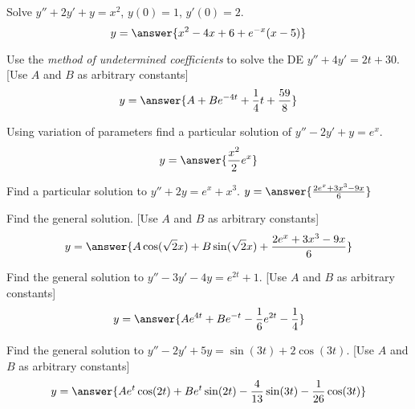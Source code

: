 \documentclass{ximera}
\begin{document}
\begin{exercise}%
    Solve $y''+2y'+y = x^2$, $y(0)=1$, $y'(0)=2$.
    \[
        y = \answer{x^2 - 4x + 6 + e^{-x}(x-5)}
    \]
\end{exercise}

\begin{exercise}
    Use the \textit{method of undetermined coefficients} to solve the DE $y''+4y'=2t+30$. [Use $A$ and $B$ as arbitrary constants]
    \[
        y = \answer{A + Be^{-4t} + \frac{1}{4}t + \frac{59}{8}}
    \]
\end{exercise}

\begin{exercise}
    Using variation of parameters find a particular solution of $y''-2y'+y = e^x$.
    \[
        y = \answer{\frac{x^2}{2}e^x}
    \]
%    
\end{exercise}


\begin{exercise}%
    Find a particular solution to $y''+2y=e^x + x^3$. $y=\answer{\frac{2e^x+3x^3-9x}{6}}$
    
    \begin{problem}
        Find the general solution. [Use $A$ and $B$ as arbitrary constants]
        \[
            y=\answer{A \cos(\sqrt{2} x) + B \sin(\sqrt{2} x) + \frac{2e^x+3x^3-9x}{6}}
        \]
    \end{problem}
\end{exercise}


\begin{exercise}
    Find the general solution to $y'' - 3y' - 4y = e^{2t} + 1$. [Use $A$ and $B$ as arbitrary constants]
    \[
        y=\answer{A e^{4t} + B e^{-t} - \frac{1}{6}e^{2t} - \frac{1}{4}}
    \]
\end{exercise}

\begin{exercise}
    Find the general solution to $y'' - 2y' + 5y = \sin(3t) + 2\cos(3t)$. [Use $A$ and $B$ as arbitrary constants]
    \[
        y=\answer{A e^t\cos(2t) + Be^t\sin(2t) - \frac{4}{13}\sin(3t) - \frac{1}{26}\cos(3t)}
    \]
\end{exercise}
\end{document}
